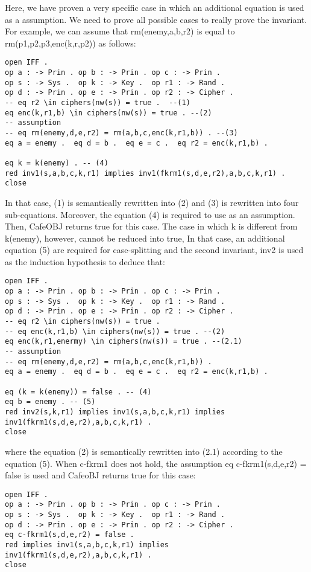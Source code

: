 \documentclass[a4paper,fleqn]{cas-dc}
\begin{document}
Here, we have proven a very specific case in which an additional equation is used as a assumption. We need to prove all possible cases to really prove the invariant. For example, we can assume that rm(enemy,a,b,r2) is equal to rm(p1,p2,p3,enc(k,r,p2)) as follows: 
\begin{small}
\begin{verbatim}
open IFF .
op a : -> Prin . op b : -> Prin . op c : -> Prin .
op s : -> Sys .  op k : -> Key .  op r1 : -> Rand .
op d : -> Prin . op e : -> Prin . op r2 : -> Cipher .
-- eq r2 \in ciphers(nw(s)) = true .  --(1)
eq enc(k,r1,b) \in ciphers(nw(s)) = true . --(2)
-- assumption
-- eq rm(enemy,d,e,r2) = rm(a,b,c,enc(k,r1,b)) . --(3)
eq a = enemy .  eq d = b .  eq e = c .  eq r2 = enc(k,r1,b) .

eq k = k(enemy) . -- (4)
red inv1(s,a,b,c,k,r1) implies inv1(fkrm1(s,d,e,r2),a,b,c,k,r1) .
close
\end{verbatim}
\end{small}
In that case, (1) is semantically rewritten into (2) and (3) is rewritten into four sub-equations. Moreover, the equation (4) is required to use as an assumption. Then, CafeOBJ returns true for this case. The case in which k is different from k(enemy), however, cannot be reduced into true, In that case, an additional equation (5) are required for case-splitting and the second invariant, inv2 is used as the induction hypothesis to deduce that:
\begin{small}
\begin{verbatim}
open IFF .
op a : -> Prin . op b : -> Prin . op c : -> Prin .
op s : -> Sys .  op k : -> Key .  op r1 : -> Rand .
op d : -> Prin . op e : -> Prin . op r2 : -> Cipher .
-- eq r2 \in ciphers(nw(s)) = true .  
-- eq enc(k,r1,b) \in ciphers(nw(s)) = true . --(2)
eq enc(k,r1,enermy) \in ciphers(nw(s)) = true . --(2.1)
-- assumption
-- eq rm(enemy,d,e,r2) = rm(a,b,c,enc(k,r1,b)) . 
eq a = enemy .  eq d = b .  eq e = c .  eq r2 = enc(k,r1,b) .

eq (k = k(enemy)) = false . -- (4)
eq b = enemy . -- (5)
red inv2(s,k,r1) implies inv1(s,a,b,c,k,r1) implies inv1(fkrm1(s,d,e,r2),a,b,c,k,r1) .
close
\end{verbatim}
\end{small}
where the equation (2) is semantically rewritten into (2.1) according to the equation (5). When c-fkrm1 does not hold, the assumption eq c-fkrm1(s,d,e,r2) = false is used and CafeoBJ returns true for this case:
\begin{small}
\begin{verbatim}
open IFF .
op a : -> Prin . op b : -> Prin . op c : -> Prin .
op s : -> Sys .  op k : -> Key .  op r1 : -> Rand .
op d : -> Prin . op e : -> Prin . op r2 : -> Cipher .
eq c-fkrm1(s,d,e,r2) = false .
red implies inv1(s,a,b,c,k,r1) implies inv1(fkrm1(s,d,e,r2),a,b,c,k,r1) .
close
\end{verbatim}
\end{small}
\end{document}
